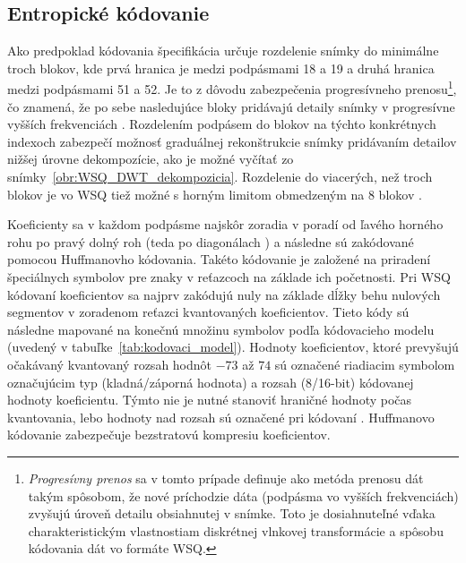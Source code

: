   \subsection{Entropické kódovanie}
  Ako predpoklad kódovania špecifikácia určuje rozdelenie snímky do minimálne troch blokov, kde prvá hranica je medzi podpásmami 18 a 19 a druhá
  hranica medzi podpásmami 51 a 52. Je to z dôvodu zabezpečenia progresívneho prenosu\footnote{\emph{Progresívny prenos} sa v tomto prípade definuje ako
  metóda prenosu dát takým spôsobom, že nové príchodzie dáta (podpásma vo vyšších frekvenciách) zvyšujú úroveň detailu obsiahnutej v snímke.
  Toto je dosiahnuteľné vďaka charakteristickým vlastnostiam diskrétnej vlnkovej transformácie a spôsobu kódovania dát vo formáte WSQ.}, čo znamená,
  že po sebe nasledujúce bloky pridávajú detaily snímky v progresívne vyšších frekvenciách \cite{WSQSpecification}. Rozdelením podpásem do blokov na týchto
  konkrétnych indexoch zabezpečí možnosť graduálnej rekonštrukcie snímky pridávaním detailov nižšej úrovne dekompozície,
  ako je možné vyčítať zo snímky~{\ref{obr:WSQ_DWT_dekompozicia}}. Rozdelenie do viacerých, než troch blokov je vo WSQ tiež možné s horným limitom obmedzeným
  na 8 blokov \cite{brislawn1996compression}.

  Koeficienty sa v každom podpásme najskôr zoradia v poradí od ľavého horného rohu po pravý dolný roh (teda po diagonálach )
  a následne sú zakódované pomocou Huffmanovho kódovania. Takéto kódovanie je založené na priradení špeciálnych symbolov pre znaky v reťazcoch na základe
  ich početnosti. Pri WSQ kódovaní koeficientov sa najprv zakódujú nuly na základe dĺžky behu nulových segmentov v zoradenom reťazci kvantovaných koeficientov.
  Tieto kódy sú následne mapované na konečnú množinu symbolov podľa kódovacieho modelu (uvedený v tabuľke~{\ref{tab:kodovaci_model}}). Hodnoty koeficientov,
  ktoré prevyšujú očakávaný kvantovaný rozsah hodnôt $-73$ až $74$ sú označené riadiacim symbolom označujúcim typ (kladná/záporná hodnota) a rozsah (8/16-bit)
  kódovanej hodnoty koeficientu. Týmto nie je nutné stanoviť hraničné hodnoty počas kvantovania, lebo hodnoty nad rozsah sú označené pri
  kódovaní \cite{brislawn1996compression}. Huffmanovo kódovanie zabezpečuje bezstratovú kompresiu koeficientov.

